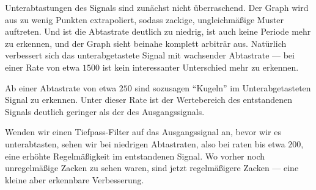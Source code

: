 \documentclass[a4paper,11pt]{article}
\begin{document}
\begin{enumerate}
\begin{enumerate}
					Unterabtastungen des Signals sind zunächst nicht überraschend.
					Der Graph wird aus zu wenig Punkten extrapoliert, sodass
					zackige, ungleichmäßige Muster auftreten. Und ist die
					Abtastrate deutlich zu niedrig, ist auch keine Periode
					mehr zu erkennen, und der Graph sieht beinahe komplett
					arbiträr aus.
					Natürlich verbessert sich das unterabgetastete Signal mit
					wachsender Abtastrate --- bei einer Rate von etwa $1500$
					ist kein interessanter Unterschied mehr zu erkennen.

					Ab einer Abtastrate von etwa $250$ sind sozusagen ``Kugeln''
					im Unterabgetasteten Signal zu erkennen.
					Unter dieser Rate ist der Wertebereich des entstandenen
					Signals deutlich geringer als der des Ausgangssignals.

					Wenden wir einen Tiefpass-Filter auf das Ausgangssignal an,
					bevor wir es unterabtasten, sehen wir bei niedrigen Abtastraten,
					also bei raten bis etwa $200$, eine erhöhte Regelmäßigkeit
					im entstandenen Signal. Wo vorher noch unregelmäßige Zacken
					zu sehen waren, sind jetzt regelmäßigere Zacken --- eine kleine
					aber erkennbare Verbesserung.
			\end{enumerate}
	\end{enumerate}
\end{document}
